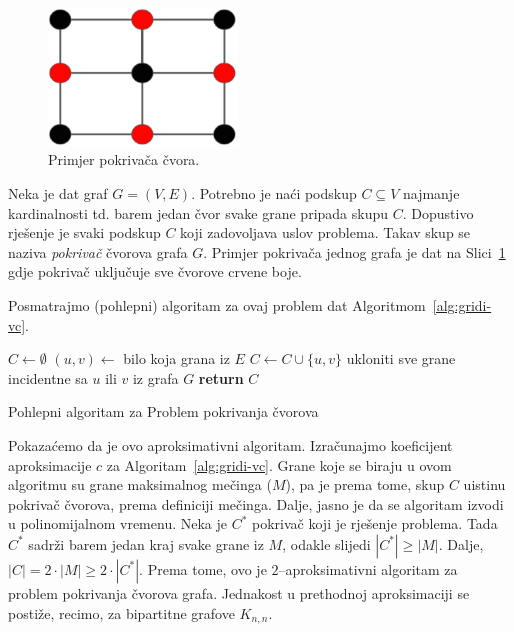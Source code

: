 \documentclass[a4paper, utf8, 11pt, colorlinks]{book}
\begin{document}
    \begin{figure}
  	\centering
  	\includegraphics[width=50mm]{vertex-cover.eps}

  	\caption{Primjer pokrivača čvora.}   	\label{fig:vertex-cover}
  \end{figure}
  Neka je dat graf $G=(V,E)$. Potrebno je naći podskup $C\subseteq V$ najmanje kardinalnosti td. barem jedan čvor svake grane pripada skupu $C$.  Dopustivo rješenje je svaki podskup $C$ koji zadovoljava uslov problema. Takav skup se naziva \emph{pokrivač} čvorova grafa $G$. Primjer pokrivača jednog grafa je dat na Slici~\ref{fig:vertex-cover} gdje pokrivač uključuje sve čvorove crvene boje. 
  

  
  Posmatrajmo (pohlepni) algoritam za ovaj problem dat Algoritmom~\ref{alg:gridi-vc}. 
  
  \begin{algorithm}[H] 
  	\begin{algorithmic}[1]
  		\STATE $C \gets \emptyset$
  		\STATE $(u,v) \gets$ bilo koja grana iz $E$
  		\STATE $C \gets C \cup \{u,v\}$
  		\STATE ukloniti sve grane incidentne sa  $u$ ili $v$ iz grafa $G$
  		\ENDWHILE
  		\STATE \textbf{return} $C$
  	\end{algorithmic}   
   
     \caption{Pohlepni algoritam za Problem pokrivanja čvorova}
 \label{alg:gridi-vc}
  \end{algorithm}
  
  \noindent Pokazaćemo da je ovo aproksimativni algoritam. Izračunajmo koeficijent aproksimacije $c$ za Algoritam~\ref{alg:gridi-vc}.
  Grane koje se biraju u ovom algoritmu su grane maksimalnog mečinga ($M$), pa je prema tome, skup $C$ uistinu pokrivač čvorova, prema definiciji mečinga. Dalje, jasno je da se algoritam izvodi u polinomijalnom vremenu. Neka je $C^*$ pokrivač koji je rješenje problema. Tada $C^*$ sadrži barem jedan kraj svake grane iz $M$, odakle slijedi $|C^*|\geq |M|$. Dalje, $|C|= 2 \cdot |M| \geq 2 \cdot |C^*|$. Prema tome, ovo je $2$--aproksimativni algoritam za problem pokrivanja čvorova grafa. Jednakost u prethodnoj aproksimaciji se postiže, recimo, za bipartitne grafove $K_{n,n}$. 
  
\end{document}

